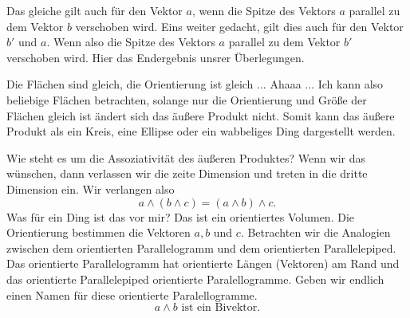 \documentclass[fleqn]{scrartcl}
\numberwithin{equation}{section}
\begin{document}
Das gleiche gilt auch für den Vektor $a$, wenn die Spitze des Vektors $a$
parallel zu dem Vektor $b$ verschoben wird. Eins weiter gedacht, gilt dies auch
für den Vektor $b'$ und $a$. Wenn also die Spitze des Vektors $a$ parallel zu
dem Vektor $b'$ verschoben wird. 
Hier das Endergebnis unsrer Überlegungen.
\begin{center}
\begin{minipage}{\linewidth}
\centering
{}
\label{fig:shiftshift}
\end{minipage}
\end{center}

Die Flächen sind gleich, die Orientierung ist gleich ... Ahaaa ... Ich kann
also beliebige Flächen betrachten, solange nur die Orientierung und Größe der
Flächen gleich ist ändert sich das äußere Produkt nicht. Somit kann das äußere
Produkt als ein Kreis, eine Ellipse oder ein wabbeliges Ding dargestellt
werden.

Wie steht es um die Assoziativität des äußeren Produktes? Wenn wir das
wünschen, dann verlassen wir die zeite Dimension und treten in die dritte
Dimension ein. Wir verlangen also
\[a\wedge(b\wedge c) =(a\wedge b)\wedge c.\]
Was für ein Ding ist das vor mir? Das ist ein orientiertes Volumen. Die
Orientierung bestimmen die Vektoren $a, b$ und $c$. Betrachten wir die
Analogien zwischen dem orientierten Parallelogramm und dem orientierten
Parallelepiped. Das orientierte Parallelogramm hat orientierte Längen
(Vektoren) am Rand und das orientierte Parallelepiped orientierte
Paralellogramme. Geben wir endlich einen Namen für diese orientierte
Paralellogramme.
\[a\wedge b\textrm{ ist ein Bivektor.}\]
\end{document}
